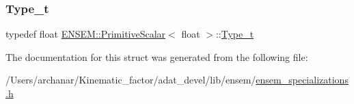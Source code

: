 \subsubsection{\texorpdfstring{Type\_t}{Type\_t}\hspace{0.1cm}{\footnotesize\ttfamily [2/2]}}
{\footnotesize\ttfamily typedef float \mbox{\hyperlink{structENSEM_1_1PrimitiveScalar}{E\+N\+S\+E\+M\+::\+Primitive\+Scalar}}$<$ float $>$\+::\mbox{\hyperlink{structENSEM_1_1PrimitiveScalar_3_01float_01_4_a227fd22d14a3854ff0e0afbf40a04433}{Type\+\_\+t}}}



The documentation for this struct was generated from the following file\+:\begin{DoxyCompactItemize}
\item 
/\+Users/archanar/\+Kinematic\+\_\+factor/adat\+\_\+devel/lib/ensem/\mbox{\hyperlink{lib_2ensem_2ensem__specializations_8h}{ensem\+\_\+specializations.\+h}}\end{DoxyCompactItemize}
